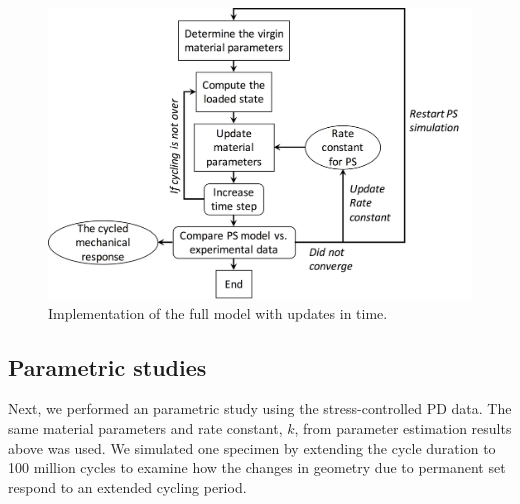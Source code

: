 

\begin{figure}[hbt]
\centering
\includegraphics[width=5in]{Images/chapter4/figure13}
\caption{Implementation of the full model with updates in time.}
\label{fig:implementation}
\end{figure}


\subsection{Parametric studies}
Next, we performed an parametric study using the stress-controlled PD data. The same material parameters and rate constant, $k$, from parameter estimation results above was used. We simulated one specimen by extending the cycle duration to 100 million cycles to examine how the changes in geometry due to permanent set respond to an extended cycling period. 